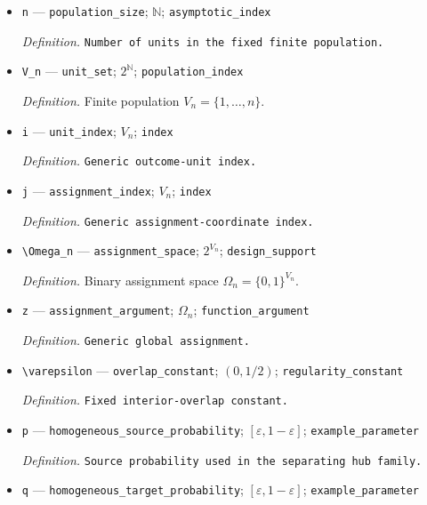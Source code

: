 \documentclass{article}
\begin{document}
\begin{itemize}
  \item \texttt{n} --- \texttt{population\_\allowbreak{}size}; \(\mathbb N\); \texttt{asymptotic\_\allowbreak{}index}
  \par\smallskip\noindent\emph{Definition.} \texttt{Number of units in the fixed finite population.}
  \item \texttt{V\_\allowbreak{}n} --- \texttt{unit\_\allowbreak{}set}; \(2^{\mathbb N}\); \texttt{population\_\allowbreak{}index}
  \par\smallskip\noindent\emph{Definition.} Finite population \(V_n=\{1,\ldots,n\}\).
  \item \texttt{i} --- \texttt{unit\_\allowbreak{}index}; \(V_n\); \texttt{index}
  \par\smallskip\noindent\emph{Definition.} \texttt{Generic outcome-\allowbreak{}unit index.}
  \item \texttt{j} --- \texttt{assignment\_\allowbreak{}index}; \(V_n\); \texttt{index}
  \par\smallskip\noindent\emph{Definition.} \texttt{Generic assignment-\allowbreak{}coordinate index.}
  \item \texttt{\textbackslash{}\allowbreak{}Omega\_\allowbreak{}n} --- \texttt{assignment\_\allowbreak{}space}; \(2^{V_n}\); \texttt{design\_\allowbreak{}support}
  \par\smallskip\noindent\emph{Definition.} Binary assignment space \(\Omega_n=\{0,1\}^{V_n}\).
  \item \texttt{z} --- \texttt{assignment\_\allowbreak{}argument}; \(\Omega_n\); \texttt{function\_\allowbreak{}argument}
  \par\smallskip\noindent\emph{Definition.} \texttt{Generic global assignment.}
  \item \texttt{\textbackslash{}\allowbreak{}varepsilon} --- \texttt{overlap\_\allowbreak{}constant}; \((0,1/2)\); \texttt{regularity\_\allowbreak{}constant}
  \par\smallskip\noindent\emph{Definition.} \texttt{Fixed interior-\allowbreak{}overlap constant.}
  \item \texttt{p} --- \texttt{homogeneous\_\allowbreak{}source\_\allowbreak{}probability}; \([\varepsilon,1-\varepsilon]\); \texttt{example\_\allowbreak{}parameter}
  \par\smallskip\noindent\emph{Definition.} \texttt{Source probability used in the separating hub family.}
  \item \texttt{q} --- \texttt{homogeneous\_\allowbreak{}target\_\allowbreak{}probability}; \([\varepsilon,1-\varepsilon]\); \texttt{example\_\allowbreak{}parameter}

\end{itemize}
\end{document}
